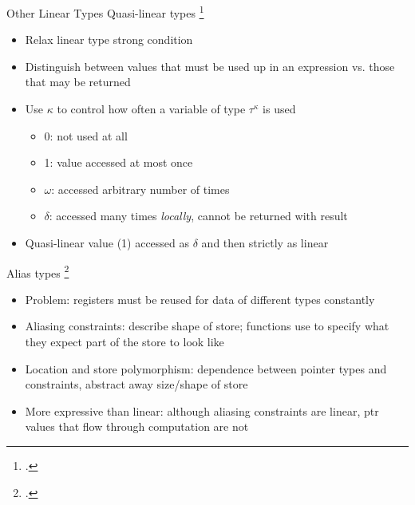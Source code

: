 \documentclass[aspectratio=169]{beamer}
\begin{document}
\begin{frame}{Other Linear Types}
  Quasi-linear types \footcite{kobayashi_quasi-linear_1999}
    \begin{itemize}
        \item Relax linear type strong condition
        \item Distinguish between values that must be used up in an expression vs. those that may be returned
        \item Use $\kappa$ to control how often a variable of type $\tau^{\kappa}$ is used
            \begin{itemize}
                \item 0: not used at all
                \item 1: value accessed at most once
                \item $\omega$: accessed arbitrary number of times
                \item $\delta$: accessed many times \emph{locally}, cannot be returned with result
            \end{itemize}
        \item Quasi-linear value (1) accessed as $\delta$ and then strictly as linear
    \end{itemize}
  Alias types \footcite{smith_alias_2000}
    \begin{itemize}
        \item Problem: registers must be reused for data of different types constantly
        \item Aliasing constraints: describe shape of store; functions use to specify what they expect part of the store to look like
        \item Location and store polymorphism: dependence between pointer types and constraints, abstract away size/shape of store
        \item More expressive than linear: although aliasing constraints are linear, ptr values that flow through computation are not
    \end{itemize}
\end{frame}
\end{document}
